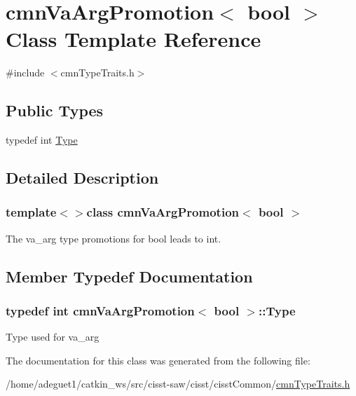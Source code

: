 \hypertarget{classcmn_va_arg_promotion_3_01bool_01_4}{\section{cmn\-Va\-Arg\-Promotion$<$ bool $>$ Class Template Reference}
\label{classcmn_va_arg_promotion_3_01bool_01_4}
}


{\ttfamily \#include $<$cmn\-Type\-Traits.\-h$>$}

\subsection*{Public Types}
\begin{DoxyCompactItemize}
\item 
typedef int \hyperlink{classcmn_va_arg_promotion_3_01bool_01_4_a0fb2466f8edcf929f9cc7c5194a694b5}{Type}
\end{DoxyCompactItemize}


\subsection{Detailed Description}
\subsubsection*{template$<$$>$class cmn\-Va\-Arg\-Promotion$<$ bool $>$}

The va\-\_\-arg type promotions for bool leads to int. 

\subsection{Member Typedef Documentation}
\hypertarget{classcmn_va_arg_promotion_3_01bool_01_4_a0fb2466f8edcf929f9cc7c5194a694b5}{
\subsubsection[{Type}]{\setlength{\rightskip}{0pt plus 5cm}typedef int {\bf cmn\-Va\-Arg\-Promotion}$<$ bool $>$\-::{\bf Type}}}\label{classcmn_va_arg_promotion_3_01bool_01_4_a0fb2466f8edcf929f9cc7c5194a694b5}
Type used for va\-\_\-arg 

The documentation for this class was generated from the following file\-:\begin{DoxyCompactItemize}
\item 
/home/adeguet1/catkin\-\_\-ws/src/cisst-\/saw/cisst/cisst\-Common/\hyperlink{cmn_type_traits_8h}{cmn\-Type\-Traits.\-h}\end{DoxyCompactItemize}
